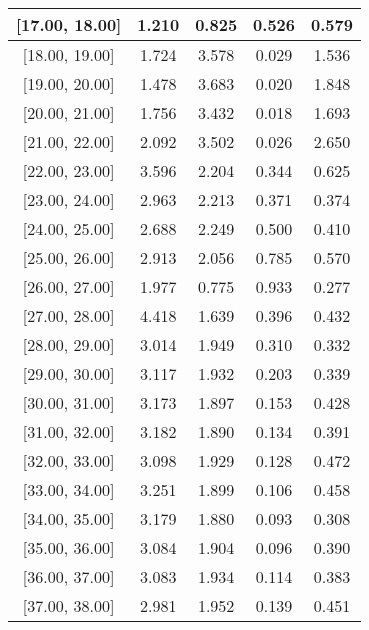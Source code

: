\documentclass[12pt]{article}
\begin{document}
\begin{table}[]
\begin{tabular}{c|c|c|c|c|}
\multicolumn{1}{|c|}{{[}17.00,  18.00{]}}  & 1.210 & 0.825 & 0.526 & 0.579 \\ \hline 
\multicolumn{1}{|c|}{{[}18.00,  19.00{]}}  & 1.724 & 3.578 & 0.029 & 1.536 \\ \hline 
\multicolumn{1}{|c|}{{[}19.00,  20.00{]}}  & 1.478 & 3.683 & 0.020 & 1.848 \\ \hline 
\multicolumn{1}{|c|}{{[}20.00,  21.00{]}}  & 1.756 & 3.432 & 0.018 & 1.693 \\ \hline 
\multicolumn{1}{|c|}{{[}21.00,  22.00{]}}  & 2.092 & 3.502 & 0.026 & 2.650 \\ \hline 
\multicolumn{1}{|c|}{{[}22.00,  23.00{]}}  & 3.596 & 2.204 & 0.344 & 0.625 \\ \hline 
\multicolumn{1}{|c|}{{[}23.00,  24.00{]}}  & 2.963 & 2.213 & 0.371 & 0.374 \\ \hline 
\multicolumn{1}{|c|}{{[}24.00,  25.00{]}}  & 2.688 & 2.249 & 0.500 & 0.410 \\ \hline 
\multicolumn{1}{|c|}{{[}25.00,  26.00{]}}  & 2.913 & 2.056 & 0.785 & 0.570 \\ \hline 
\multicolumn{1}{|c|}{{[}26.00,  27.00{]}}  & 1.977 & 0.775 & 0.933 & 0.277 \\ \hline 
\multicolumn{1}{|c|}{{[}27.00,  28.00{]}}  & 4.418 & 1.639 & 0.396 & 0.432 \\ \hline 
\multicolumn{1}{|c|}{{[}28.00,  29.00{]}}  & 3.014 & 1.949 & 0.310 & 0.332 \\ \hline 
\multicolumn{1}{|c|}{{[}29.00,  30.00{]}}  & 3.117 & 1.932 & 0.203 & 0.339 \\ \hline 
\multicolumn{1}{|c|}{{[}30.00,  31.00{]}}  & 3.173 & 1.897 & 0.153 & 0.428 \\ \hline 
\multicolumn{1}{|c|}{{[}31.00,  32.00{]}}  & 3.182 & 1.890 & 0.134 & 0.391 \\ \hline 
\multicolumn{1}{|c|}{{[}32.00,  33.00{]}}  & 3.098 & 1.929 & 0.128 & 0.472 \\ \hline 
\multicolumn{1}{|c|}{{[}33.00,  34.00{]}}  & 3.251 & 1.899 & 0.106 & 0.458 \\ \hline 
\multicolumn{1}{|c|}{{[}34.00,  35.00{]}}  & 3.179 & 1.880 & 0.093 & 0.308 \\ \hline 
\multicolumn{1}{|c|}{{[}35.00,  36.00{]}}  & 3.084 & 1.904 & 0.096 & 0.390 \\ \hline 
\multicolumn{1}{|c|}{{[}36.00,  37.00{]}}  & 3.083 & 1.934 & 0.114 & 0.383 \\ \hline 
\multicolumn{1}{|c|}{{[}37.00,  38.00{]}}  & 2.981 & 1.952 & 0.139 & 0.451 \\ \hline 

\end{tabular}
\end{table}
\end{document}

